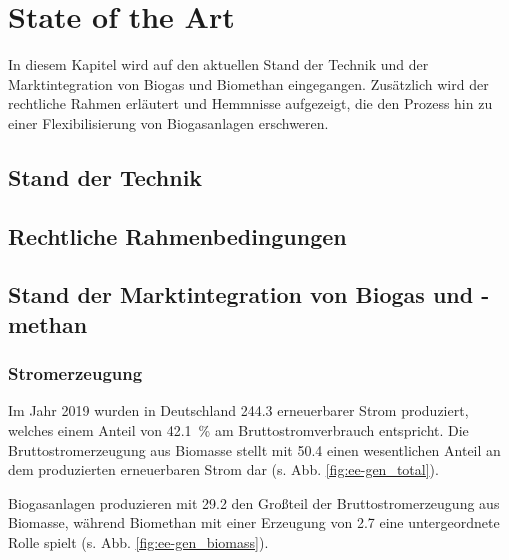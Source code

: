 \section{State of the Art}

In diesem Kapitel wird auf den aktuellen Stand der Technik und der Marktintegration von Biogas und Biomethan eingegangen. Zusätzlich wird der rechtliche Rahmen erläutert und Hemmnisse aufgezeigt, die den Prozess hin zu einer Flexibilisierung von Biogasanlagen erschweren.

\subsection{Stand der Technik}


\subsection{Rechtliche Rahmenbedingungen}\label{chap:law_theo}


\subsection{Stand der Marktintegration von Biogas und -methan}

\subsubsection{Stromerzeugung}

Im Jahr 2019 wurden in Deutschland \SI{244.3}{\twh} erneuerbarer Strom produziert, welches einem Anteil von \SI{42.1}{\percent} am Bruttostromverbrauch entspricht. Die Bruttostromerzeugung aus Biomasse stellt mit \SI{50.4}{\twh} einen wesentlichen Anteil an dem produzierten erneuerbaren Strom dar (s. Abb. \ref{fig:ee-gen_total}). \parencite{BWE2020} 



Biogasanlagen produzieren mit \SI{29.2}{\twh} den Großteil der Bruttostromerzeugung aus Biomasse, während Biomethan mit einer Erzeugung von \SI{2.7}{\twh} eine untergeordnete Rolle spielt (s. Abb. \ref{fig:ee-gen_biomass}). \parencite{BWE2020} 

